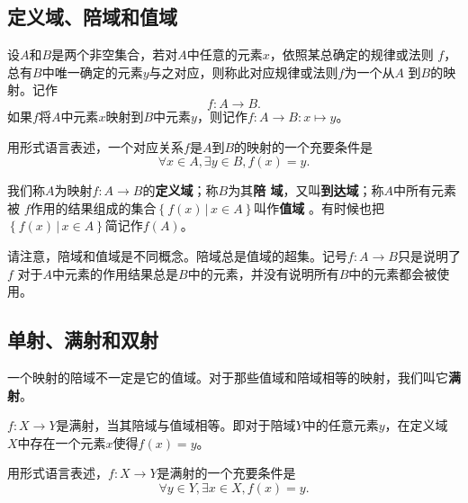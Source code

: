 \subsection{定义域、陪域和值域}

\begin{rawdef}[映射]
    设$A$和$B$是两个非空集合，若对$A$中任意的元素$x$，依照某总确定的规律或法则
    $f$，总有$B$中唯一确定的元素$y$与之对应，则称此对应规律或法则$f$为一个从$A$
    到$B$的映射。记作
    \[
        f: A \to B.
    \]
    如果$f$将$A$中元素$x$映射到$B$中元素$y$，则记作$f: A\to B: x\mapsto y$。

    用形式语言表述，一个对应关系$f$是$A$到$B$的映射的一个充要条件是
    \[
        \forall x \in A, \exists y \in B, f(x)=y.
    \]
\end{rawdef}

我们称$A$为映射$f: A \to B$的\textbf{定义域}；称$B$为其\textbf{陪
域}，又叫\textbf{到达域}；称$A$中所有元素被
$f$作用的结果组成的集合$\left\{ f(x) \,|\, x\in A \right\} $叫作\textbf{值域}
。有时候也把$\left\{ f(x) \,|\, x\in A \right\} $简记作$f(A)$。

请注意，陪域和值域是不同概念。陪域总是值域的超集。记号$f: A \to B$只是说明了$f$
对于$A$中元素的作用结果总是$B$中的元素，并没有说明所有$B$中的元素都会被使用。


\subsection{单射、满射和双射}

一个映射的陪域不一定是它的值域。对于那些值域和陪域相等的映射，我们叫它\textbf{满
射}。

\begin{rawdef}[满射]
    $f:X\to Y$是满射，当其陪域与值域相等。即对于陪域$Y$中的任意元素$y$，在定义域
    $X$中存在一个元素$x$使得$f(x)=y$。

    用形式语言表述，$f:X\to Y$是满射的一个充要条件是
    \[
        \forall y \in Y, \exists x \in X, f(x)=y.
    \]
\end{rawdef}

